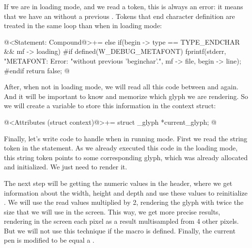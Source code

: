 {{{{{If we are in loading mode, and we read a  token,
this is always an error: it means that we have an 
without a previous . Tokens that end character
definition are treated in the same loop than 
when in loading mode:

\iniciocodigo
@<Statement: Compound@>+=
else if(begin -> type == TYPE_ENDCHAR && mf -> loading){
#if defined(W_DEBUG_METAFONT)
  fprintf(stderr, "METAFONT: Error: %
                  "without previous 'beginchar'.\n", mf -> file,
          begin -> line);
#endif
  return false;
}
@
\fimcodigo

After, when not in loading mode, we will read all this code
between  and  again. And it
will be important to know and memorize which glyph we are
rendering. So we will create a variable to store this information in
the context struct:

\iniciocodigo
@<Attributes (struct context)@>+=
struct _glyph *current_glyph;
@
\fimcodigo

Finally, let's write code to handle  when in
running mode. First we read the string token in the statement. As we
already executed this code in the loading mode, this string token
points to some corresponding glyph, which was already allocated and
initialized. We just need to render it.

The next step will be getting the numeric values in
the  header, where we get information about the
width, height and depth and use these values to
reinitialize . We will use the read values
multiplied by 2, rendering the glyph with twice the size that we will
use in the screen. This way, we get more precise results, rendering in
the screen each pixel as a result multisampled from 4 other
pixels. But we will not use this technique if the
macro  is
defined. Finally, the current pen is modified to be equal
a .

}}}}}
